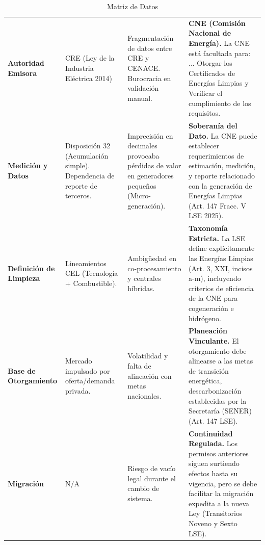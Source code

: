 \documentclass{cel}
\begin{document}
\vspace{0.3cm}
\begin{tabladoradoLargo}
\renewcommand{\tabularxcolumn}[1]{p{#1}}
\begin{xltabular}{\textwidth}{|X|X|X|X|}
\caption{Matriz de Datos} \\
\toprule
{}  &  &  &  \\
\midrule
\endhead
\textbf{Autoridad Emisora} & CRE (Ley de la Industria Eléctrica 2014) & Fragmentación de datos entre CRE y CENACE. Burocracia en validación manual. & \textbf{CNE (Comisión Nacional de Energía).} \textquotedbl{}La CNE está facultada para: ... Otorgar los Certificados de Energías Limpias\textquotedbl{} y \textquotedbl{}Verificar el cumplimiento de los requisitos\textquotedbl{}. \\ \hline
\textbf{Medición y Datos} & Disposición 32 (Acumulación simple). Dependencia de reporte de terceros. & Imprecisión en decimales provocaba pérdidas de valor en generadores pequeños (Micro-generación). & \textbf{Soberanía del Dato.} \textquotedbl{}La CNE puede establecer requerimientos de estimación, medición, y reporte relacionado con la generación de Energías Limpias\textquotedbl{} (Art. 147 Fracc. V LSE 2025). \\ \hline
\textbf{Definición de Limpieza} & Lineamientos CEL (Tecnología + Combustible). & Ambigüedad en co-procesamiento y centrales híbridas. & \textbf{Taxonomía Estricta.} La LSE define explícitamente las Energías Limpias (Art. 3, XXI, incisos a-m), incluyendo criterios de eficiencia de la CNE para cogeneración e hidrógeno. \\ \hline
\textbf{Base de Otorgamiento} & Mercado impulsado por oferta/demanda privada. & Volatilidad y falta de alineación con metas nacionales. & \textbf{Planeación Vinculante.} El otorgamiento debe alinearse a las \textquotedbl{}metas de transición energética, descarbonización\textquotedbl{} establecidas por la Secretaría (SENER) (Art. 147 LSE). \\ \hline
\textbf{Migración} & N/A & Riesgo de vacío legal durante el cambio de sistema. & \textbf{Continuidad Regulada.} Los permisos anteriores siguen surtiendo efectos hasta su vigencia, pero se debe facilitar la migración expedita a la nueva Ley (Transitorios Noveno y Sexto LSE). \\ \hline
\bottomrule
\end{xltabular}
\end{tabladoradoLargo}
\end{document}
